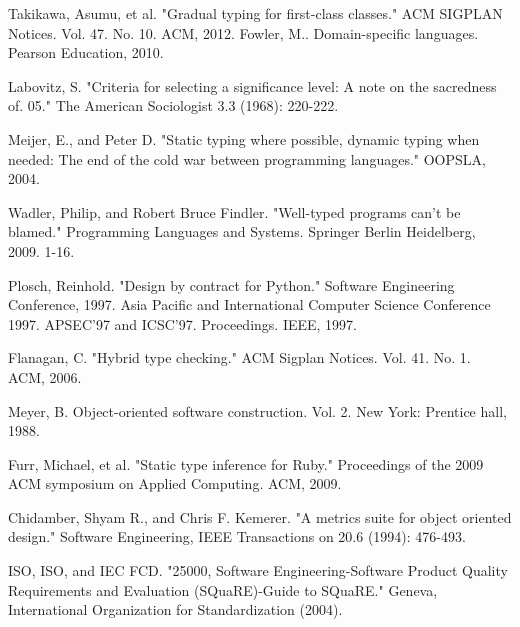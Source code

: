 \documentclass[msc]{ppgccufmg}
\begin{document}
\begin{thebibliography}{}
Takikawa, Asumu, et al. "Gradual typing for first-class classes." ACM SIGPLAN Notices. Vol. 47. No. 10. ACM, 2012.
Fowler, M.. Domain-specific languages. Pearson Education, 2010.

Labovitz, S. "Criteria for selecting a significance level: A note on the sacredness of. 05." The American Sociologist 3.3 (1968): 220-222.

Meijer, E., and Peter D. "Static typing where possible, dynamic typing when needed: The end of the cold war between programming languages." OOPSLA, 2004.

Wadler, Philip, and Robert Bruce Findler. "Well-typed programs can't be blamed." Programming Languages and Systems. Springer Berlin Heidelberg, 2009. 1-16.

Plosch, Reinhold. "Design by contract for Python." Software Engineering Conference, 1997. Asia Pacific and International Computer Science Conference 1997. APSEC'97 and ICSC'97. Proceedings. IEEE, 1997.

Flanagan, C. "Hybrid type checking." ACM Sigplan Notices. Vol. 41. No. 1. ACM, 2006.

Meyer, B. Object-oriented software construction. Vol. 2. New York: Prentice hall, 1988.

Furr, Michael, et al. "Static type inference for Ruby." Proceedings of the 2009 ACM symposium on Applied Computing. ACM, 2009.

Chidamber, Shyam R., and Chris F. Kemerer. "A metrics suite for object oriented design." Software Engineering, IEEE Transactions on 20.6 (1994): 476-493.

ISO, ISO, and IEC FCD. "25000, Software Engineering-Software Product Quality Requirements and Evaluation (SQuaRE)-Guide to SQuaRE." Geneva, International Organization for Standardization (2004).


\end{thebibliography}
\end{document}
